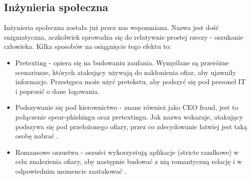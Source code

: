 \documentclass[]{article}
\begin{document}
\subsection{Inżynieria społeczna}
Inżynieria społeczna została już przez nas wspomniana. Nazwa jest dość enigmatyczna, aczkolwiek sprowadza się do relatywnie prostej rzeczy - oszukanie człowieka. Kilka sposobów na osiągnięcie tego efektu to:
\begin{itemize}[label=$\rightarrow$]
	\item Pretexting - opiera się na budowaniu zaufania. Wymyślane są przeróżne scenariusze, których atakujący używają do nakłonienia ofiar, aby ujawniły informacje. Przestępca może użyć pretekstu, aby podszyć się pod personel IT i poprosić o dane logowania.
	\item Podszywanie się pod kierownictwo - znane również jako CEO fraud, jest to połączenie spear-phishingu oraz pretextingu. Jak nazwa wskazuje, atakujący podszywa się pod przełożonego ofiary, przez co zdecydowanie łatwiej jest taką osobę nabrać .
	\item Romansowe oszustwa - oszuści wykorzystują aplikacje (stricte randkowe) w celu znalezienia ofiary, aby następnie budować z nią romantyczną relację i w odpowiednim momencie zaatakować \cite{abnormal_phishingtypes}.
\end{itemize} 
\end{document}
